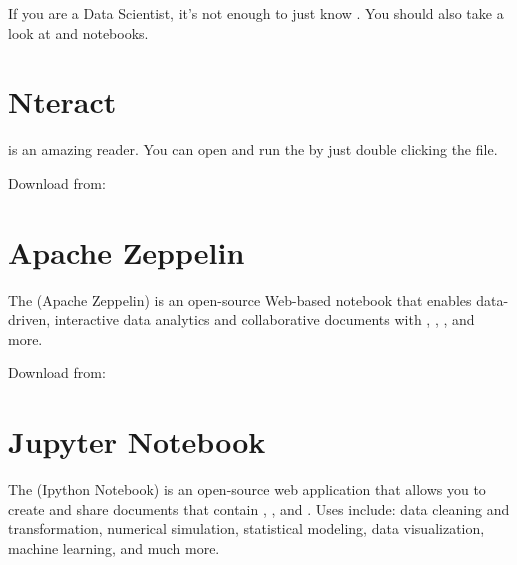 \documentclass[letterpaper,12pt,english]{sphinxmanual}
\begin{document}
If you are a Data Scientist, it’s not enough to just know . You should also take a look at  and  notebooks.


\section{Nteract}
\label{\detokenize{nb:nteract}}
 is an amazing  reader. You can open and run the  by just double clicking the  file.

Download from: 

\begin{figure}[htbp]
\centering

\noindent{}
\end{figure}


\section{Apache Zeppelin}
\label{\detokenize{nb:apache-zeppelin}}
The  (Apache Zeppelin) is an open-source Web-based notebook that enables data-driven,
interactive data analytics and collaborative documents with , , ,  and more.

Download from: 

\begin{figure}[htbp]
\centering

\noindent{}
\end{figure}


\section{Jupyter Notebook}
\label{\detokenize{nb:jupyter-notebook}}
The  (Ipython Notebook) is an open-source web application that allows you to create and share documents that contain , ,  and . Uses include: data cleaning and transformation, numerical simulation, statistical modeling, data visualization, machine learning, and much more.
\end{document}
